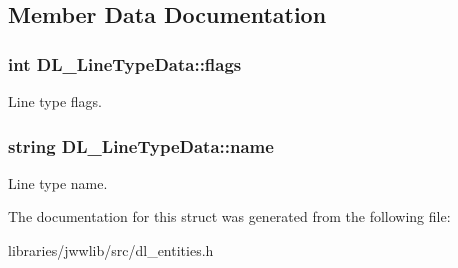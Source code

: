 \subsection{Member Data Documentation}
\hypertarget{structDL__LineTypeData_a6c18a7c0007eda5978f8331e49a729bf}{
\subsubsection[{flags}]{\setlength{\rightskip}{0pt plus 5cm}int D\-L\-\_\-\-Line\-Type\-Data\-::flags}}\label{structDL__LineTypeData_a6c18a7c0007eda5978f8331e49a729bf}
Line type flags. \hypertarget{structDL__LineTypeData_ab60a50ef501ee685ae78c368a01d3e91}{
\subsubsection[{name}]{\setlength{\rightskip}{0pt plus 5cm}string D\-L\-\_\-\-Line\-Type\-Data\-::name}}\label{structDL__LineTypeData_ab60a50ef501ee685ae78c368a01d3e91}
Line type name. 

The documentation for this struct was generated from the following file\-:\begin{DoxyCompactItemize}
\item 
libraries/jwwlib/src/dl\-\_\-entities.\-h\end{DoxyCompactItemize}
